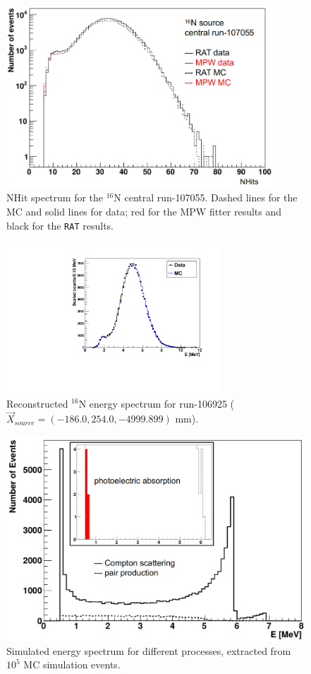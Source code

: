 \begin{figure}[htbp]
	\centering
	\includegraphics[width=10cm]{N16_nhits_107055.png}
	\caption{NHit spectrum for the $^{16}$N central run-107055. Dashed lines for the MC and solid lines for data; red for the MPW fitter results and black for the \texttt{RAT} results.}
	\label{N16nhits}
\end{figure}

\begin{figure}[htbp]
	\centering
	\includegraphics[width=8cm]{N16energyMPWcompare_106925.pdf}
	\caption{Reconstructed $^{16}$N energy spectrum for run-106925 ($\vec{X}_{source}=(-186.0,254.0,-4999.899)$ mm).}
	\label{N16_106925}
\end{figure}

\begin{figure}[htbp]
	\centering
	\includegraphics[width=12cm]{N16_MCenergySpectrum.png}
	\caption{Simulated energy spectrum for different processes, extracted from $10^5$ MC simulation events.}
	\label{N16nhitsSimu}
\end{figure}


